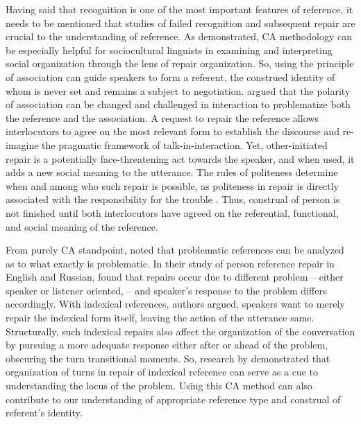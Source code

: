 \documentclass[12pt]{article}
\begin{document}
Having said that recognition is one of the most important features of reference, it needs to be mentioned that studies of failed recognition and subsequent repair are crucial to the understanding of reference. As \textcite{sidnell2008} demonstrated, CA methodology can be especially helpful for sociocultural linguists in examining and interpreting social organization through the lens of repair organization. So, using the principle of association can guide speakers to form a referent, the construed identity of whom is never set and remains a subject to negotiation. \textcite{blythe2009} argued that the polarity of association can be changed and challenged in interaction to problematize both the reference and the association. A request to repair the reference allows interlocutors to agree on the most relevant form to establish the discourse and re-imagine the pragmatic framework of talk-in-interaction. Yet, other-initiated repair is a potentially face-threatening act towards the speaker, and when used, it adds a new social meaning to the utterance. The rules of politeness determine when and among who such repair is possible, as politeness in repair is directly associated with the responsibility for the trouble \parencite{sidnell2008}. Thus, construal of person is not finished until both interlocutors have agreed on the referential, functional, and social meaning of the reference.

From purely CA standpoint, \textcite{bolden2012} noted that problematic references can be analyzed as to what exactly is problematic. In their study of person reference repair in English and Russian, \textcite{bolden2012} found that repairs occur due to different problem -- either speaker or listener oriented, -- and speaker's response to the problem differs accordingly. With indexical references, authors argued, speakers want to merely repair the indexical form itself, leaving the action of the utterance same. Structurally, such indexical repairs also affect the organization of the conversation by pursuing a more adequate response either after or ahead of the problem, obscuring the turn transitional moments. So, research by \textcite{bolden2012} demonstrated that organization of turns in repair of indexical reference can serve as a cue to understanding the locus of the problem. Using this CA method can also contribute to our understanding of appropriate reference type and construal of referent's identity.
\end{document}
